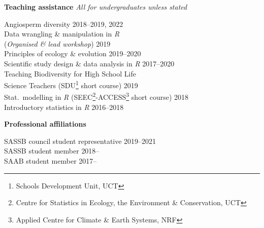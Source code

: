 \documentclass[10pt]{article}
\begin{document}
\begin{multicols}{2}
\columnbreak

\textbf{Teaching assistance} %
                   \hfill {\small \textit{All for undergraduates unless stated}}

Angiosperm diversity                         \hfill {\small 2018--2019, 2022} \\
Data wrangling \& manipulation in \textit{R}                                  \\
\hspace{2em} (\textit{Organised \& lead
  workshop})                                 \hfill {\small             2019} \\
Principles of ecology \& evolution           \hfill {\small       2019--2020} \\
Scientific study design \& data analysis in
  \textit{R}                                 \hfill {\small       2017--2020} \\
Teaching Biodiversity for High School Life                                    \\
\hspace{2em} Science Teachers {\small
  (SDU\footnote{Schools Development Unit, UCT}
  short course)}                             \hfill {\small             2019} \\
Stat.~modelling in \textit{R} {\small
  (SEEC\footnote{Centre for Statistics in
  Ecology, the Environment \&
  Conservation, UCT}-ACCESS\footnote{Applied
  Centre for Climate \& Earth Systems, NRF} short
  course)}                                   \hfill {\small             2018} \\
Introductory statistics in \textit{R}        \hfill {\small       2016--2018}

\vfill

\textbf{Professional affiliations} %

SASSB council student representative               \hfill {\small 2019--2021} \\
SASSB student member                               \hfill {\small 2018--    } \\
SAAB student member                                \hfill {\small 2017--    } \\

\end{multicols} %
\end{document}
